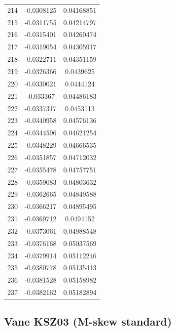 \documentclass[a4paper, 11pt, oneside]{report}
\begin{document}
{\begin{longtable}{|c|c|c|}
214 & -0.0308125 & 0.04168851 \\
215 & -0.0311755 & 0.04214797 \\
216 & -0.0315401 & 0.04260474 \\
217 & -0.0319054 & 0.04305917 \\
218 & -0.0322711 & 0.04351159 \\
219 & -0.0326366 & 0.0439625  \\
220 & -0.0330021 & 0.0444124  \\
221 & -0.033367  & 0.04486183 \\
222 & -0.0337317 & 0.0453113  \\
223 & -0.0340958 & 0.04576136 \\
224 & -0.0344596 & 0.04621254 \\
225 & -0.0348229 & 0.04666535 \\
226 & -0.0351857 & 0.04712032 \\
227 & -0.0355478 & 0.04757751 \\
228 & -0.0359083 & 0.04803632 \\
229 & -0.0362665 & 0.04849588 \\
230 & -0.0366217 & 0.04895495 \\
231 & -0.0369712 & 0.0494152  \\
232 & -0.0373061 & 0.04988548 \\
233 & -0.0376168 & 0.05037569 \\
234 & -0.0379914 & 0.05112246 \\
235 & -0.0380778 & 0.05135413 \\
236 & -0.0381528 & 0.05158982 \\
237 & -0.0382162 & 0.05182894 \\
\hline
\end{longtable}
\unskip
\unpenalty
\unpenalty}

\begin{multicols}{2}
\unvbox\ltmcbox
\end{multicols}

\subsection{Vane KSZ03 (M-skew standard)}
\end{document}
